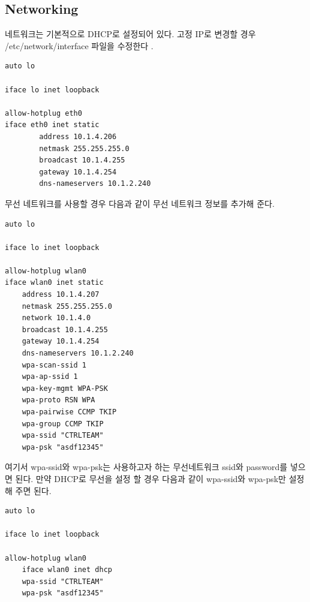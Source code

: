 \documentclass[11pt
  , a4paper
  , article
  , oneside
]{memoir}
\begin{document}
\subsection{Networking}
네트워크는 기본적으로 DHCP로 설정되어 있다. 고정 IP로 변경할 경우 /etc/network/interface 파일을 수정한다
.
\begin{lstlisting}[style=termstyle]
auto lo

iface lo inet loopback

allow-hotplug eth0
iface eth0 inet static
        address 10.1.4.206
        netmask 255.255.255.0
        broadcast 10.1.4.255
        gateway 10.1.4.254
        dns-nameservers 10.1.2.240
\end{lstlisting}
무선 네트워크를 사용할 경우 다음과 같이 무선 네트워크 정보를 추가해 준다.
\begin{lstlisting}[style=termstyle]
auto lo

iface lo inet loopback

allow-hotplug wlan0
iface wlan0 inet static
	address 10.1.4.207
	netmask 255.255.255.0
	network 10.1.4.0
	broadcast 10.1.4.255
	gateway 10.1.4.254
	dns-nameservers 10.1.2.240
	wpa-scan-ssid 1
	wpa-ap-ssid 1
	wpa-key-mgmt WPA-PSK
	wpa-proto RSN WPA
	wpa-pairwise CCMP TKIP
	wpa-group CCMP TKIP
	wpa-ssid "CTRLTEAM"
	wpa-psk "asdf12345"
\end{lstlisting}
여기서 wpa-ssid와 wpa-psk는 사용하고자 하는 무선네트워크 ssid와 password를 넣으면 된다. 
만약 DHCP로 무선을 설정 할 경우 다음과 같이 wpa-ssid와 wpa-psk만 설정해 주면 된다.
\begin{lstlisting}[style=termstyle]
auto lo

iface lo inet loopback

allow-hotplug wlan0
	iface wlan0 inet dhcp
	wpa-ssid "CTRLTEAM"
	wpa-psk "asdf12345"
\end{lstlisting}
\end{document}
